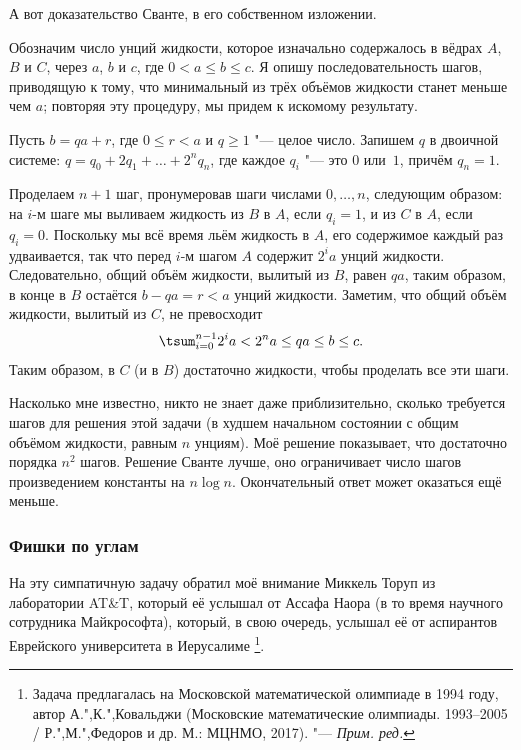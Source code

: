 \documentclass[twoside]{book}
\begin{document}
\medskip
А вот доказательство Сванте, в его собственном изложении.

\medskip

Обозначим число унций жидкости, которое изначально содержалось в вёдрах $A$, $B$ и $C$, через $a$, $b$ и $c$, где $0<a\le b\le c$.
Я опишу последовательность шагов, приводящую к тому, что минимальный
из трёх объёмов жидкости станет меньше чем $a$; повторяя эту
процедуру, мы придем к искомому результату.

Пусть $b = qa + r$, где $0\le r<a$ и $q\ge 1$ "--- целое число.
Запишем $q$ в двоичной системе: $q=q_0+2q_1+\ldots+2^nq_n$, где каждое $q_i$ "--- это $0$ или~$1$, причём $q_n = 1$.

Проделаем $n+1$ шаг, пронумеровав шаги числами $0,\dots, n$, следующим образом: на $i$-м шаге  мы выливаем жидкость из $B$ в $A$, если $q_i = 1$, и из $C$ в $A$, если $q_i = 0$.
Поскольку мы всё время льём жидкость в $A$, его содержимое каждый раз удваивается, так что  перед $i$-м шагом $A$ содержит $2^ia$ унций жидкости.
Следовательно, общий объём жидкости, вылитый из $B$, равен $qa$, таким образом, в конце  в $B$ остаётся $b-qa=r<a$ унций жидкости.
Заметим, что общий объём жидкости, вылитый из $C$, не превосходит
\[
\tsum_{i=0}^{n-1} 2^ia<2^na\le qa\le b\le c.\]
Таким образом, в $C$ (и в $B$) достаточно жидкости, чтобы проделать все эти шаги.
\heart

\medskip
Насколько мне известно, никто не знает даже приблизительно, сколько требуется шагов для решения этой задачи (в худшем начальном состоянии с общим объёмом жидкости, равным $n$ унциям).
Моё решение показывает, что достаточно порядка $n^2$ шагов.
Решение Сванте лучше, оно ограничивает число шагов произведением константы на $n\log n$.
Окончательный ответ может оказаться ещё меньше.

\subsubsection*{Фишки по углам}%

На эту симпатичную задачу обратил моё внимание Миккель Торуп из лаборатории AT\&T, %
который её услышал от Ассафа Наора %
(в то время научного сотрудника Майкрософта), который, в свою очередь, услышал её от аспирантов Еврейского университета в Иерусалиме%
\footnote{Задача предлагалась на Московской математической олимпиаде в 1994 году, автор А.",К.",Ковальджи (Московские математические олимпиады. 1993--2005 / Р.",М.",Федоров и др. М.: МЦНМО, 2017). %
"--- \emph{Прим. ред.}}.
\end{document}
